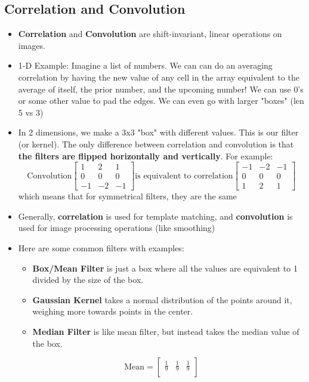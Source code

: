 \documentclass{article}
\begin{document}
\subsection{Correlation and Convolution}
\begin{itemize}
    \item \textbf{Correlation} and \textbf{Convolution} are shift-invariant, linear operations on images. 
    \item 1-D Example: Imagine a list of numbers. We can can do an averaging correlation by having the new value of any cell in the array equivalent to the average of itself, the prior number, and the upcoming number! We can use 0's or some other value to pad the edges. We can even go with larger "boxes" (len 5 vs 3)
    \item In 2 dimensions, we make a 3x3 "box" with different values. This is our filter (or kernel). The only difference between correlation and convolution is that \textbf{the filters are flipped horizontally and vertically}. For example:
$$\text{Convolution}
\begin{bmatrix}
1 & 2 & 1\\
0 & 0 & 0\\
-1 & -2 & -1
\end{bmatrix}
\text{is equivalent to correlation}
\begin{bmatrix}
-1 & -2 & -1\\
0 & 0 & 0\\
1 & 2 & 1
\end{bmatrix}
$$
which means that for symmetrical filters, they are the same
\item Generally, \textbf{correlation} is used for template matching, and \textbf{convolution} is used for image processing operations (like smoothing)
\item Here are some common filters with examples:
\begin{itemize}
    \item \textbf{Box/Mean Filter} is just a box where all the values are equivalent to 1 divided by the size of the box.
    \item \textbf{Gaussian Kernel} takes a normal distribution of the points around it, weighing more towards points in the center.
    \item \textbf{Median Filter} is like mean filter, but instead takes the median value of the box. 
\end{itemize}
$$\text{Mean}=
\begin{bmatrix}
\frac{1}{9} & \frac{1}{9} & \frac{1}{9}\\

\end{bmatrix}$$
\end{itemize}
\end{document}
